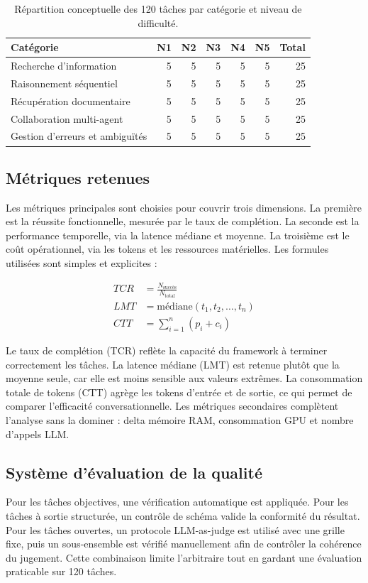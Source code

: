 \documentclass[11pt,a4paper]{article}
\begin{document}
\begin{table}[H]
\centering
\small
\begin{tabular}{lrrrrrr}
\toprule
Catégorie & N1 & N2 & N3 & N4 & N5 & Total \\
\midrule
Recherche d'information & 5 & 5 & 5 & 5 & 5 & 25 \\
Raisonnement séquentiel & 5 & 5 & 5 & 5 & 5 & 25 \\
Récupération documentaire & 5 & 5 & 5 & 5 & 5 & 25 \\
Collaboration multi-agent & 5 & 5 & 5 & 5 & 5 & 25 \\
Gestion d'erreurs et ambiguïtés & 5 & 5 & 5 & 5 & 5 & 25 \\
\bottomrule
\end{tabular}
\caption{Répartition conceptuelle des 120 tâches par catégorie et niveau de difficulté.}
\label{tab:tasks}
\end{table}

\subsection{Métriques retenues}
Les métriques principales sont choisies pour couvrir trois dimensions. La première est la réussite fonctionnelle, mesurée par le taux de complétion. La seconde est la performance temporelle, via la latence médiane et moyenne. La troisième est le coût opérationnel, via les tokens et les ressources matérielles. Les formules utilisées sont simples et explicites :

\begin{align}
TCR &= \frac{N_{\text{succès}}}{N_{\text{total}}} \\
LMT &= \text{médiane}(t_1, t_2, \dots, t_n) \\
CTT &= \sum_{i=1}^{n} \left(p_i + c_i\right)
\end{align}

Le taux de complétion (TCR) reflète la capacité du framework à terminer correctement les tâches. La latence médiane (LMT) est retenue plutôt que la moyenne seule, car elle est moins sensible aux valeurs extrêmes. La consommation totale de tokens (CTT) agrège les tokens d'entrée et de sortie, ce qui permet de comparer l'efficacité conversationnelle. Les métriques secondaires complètent l'analyse sans la dominer : delta mémoire RAM, consommation GPU et nombre d'appels LLM.

\subsection{Système d'évaluation de la qualité}
Pour les tâches objectives, une vérification automatique est appliquée. Pour les tâches à sortie structurée, un contrôle de schéma valide la conformité du résultat. Pour les tâches ouvertes, un protocole LLM-as-judge est utilisé avec une grille fixe, puis un sous-ensemble est vérifié manuellement afin de contrôler la cohérence du jugement. Cette combinaison limite l'arbitraire tout en gardant une évaluation praticable sur 120 tâches.
\end{document}
